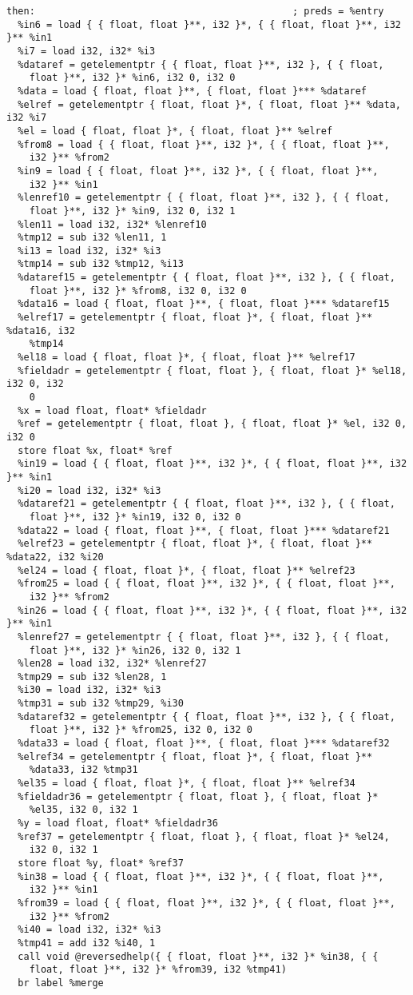 \documentclass[main.tex]{subfiles}
\begin{document}
{\begin{lstlisting}
then:                                             ; preds = %entry
  %in6 = load { { float, float }**, i32 }*, { { float, float }**, i32 }** %in1
  %i7 = load i32, i32* %i3
  %dataref = getelementptr { { float, float }**, i32 }, { { float,
    float }**, i32 }* %in6, i32 0, i32 0
  %data = load { float, float }**, { float, float }*** %dataref
  %elref = getelementptr { float, float }*, { float, float }** %data, i32 %i7
  %el = load { float, float }*, { float, float }** %elref
  %from8 = load { { float, float }**, i32 }*, { { float, float }**,
    i32 }** %from2
  %in9 = load { { float, float }**, i32 }*, { { float, float }**,
    i32 }** %in1
  %lenref10 = getelementptr { { float, float }**, i32 }, { { float, 
    float }**, i32 }* %in9, i32 0, i32 1
  %len11 = load i32, i32* %lenref10
  %tmp12 = sub i32 %len11, 1
  %i13 = load i32, i32* %i3
  %tmp14 = sub i32 %tmp12, %i13
  %dataref15 = getelementptr { { float, float }**, i32 }, { { float,
    float }**, i32 }* %from8, i32 0, i32 0
  %data16 = load { float, float }**, { float, float }*** %dataref15
  %elref17 = getelementptr { float, float }*, { float, float }** %data16, i32
    %tmp14
  %el18 = load { float, float }*, { float, float }** %elref17
  %fieldadr = getelementptr { float, float }, { float, float }* %el18, i32 0, i32
    0
  %x = load float, float* %fieldadr
  %ref = getelementptr { float, float }, { float, float }* %el, i32 0, i32 0
  store float %x, float* %ref
  %in19 = load { { float, float }**, i32 }*, { { float, float }**, i32 }** %in1
  %i20 = load i32, i32* %i3
  %dataref21 = getelementptr { { float, float }**, i32 }, { { float,
    float }**, i32 }* %in19, i32 0, i32 0
  %data22 = load { float, float }**, { float, float }*** %dataref21
  %elref23 = getelementptr { float, float }*, { float, float }** %data22, i32 %i20
  %el24 = load { float, float }*, { float, float }** %elref23
  %from25 = load { { float, float }**, i32 }*, { { float, float }**,
    i32 }** %from2
  %in26 = load { { float, float }**, i32 }*, { { float, float }**, i32 }** %in1
  %lenref27 = getelementptr { { float, float }**, i32 }, { { float,
    float }**, i32 }* %in26, i32 0, i32 1
  %len28 = load i32, i32* %lenref27
  %tmp29 = sub i32 %len28, 1
  %i30 = load i32, i32* %i3
  %tmp31 = sub i32 %tmp29, %i30
  %dataref32 = getelementptr { { float, float }**, i32 }, { { float,
    float }**, i32 }* %from25, i32 0, i32 0
  %data33 = load { float, float }**, { float, float }*** %dataref32
  %elref34 = getelementptr { float, float }*, { float, float }** 
    %data33, i32 %tmp31
  %el35 = load { float, float }*, { float, float }** %elref34
  %fieldadr36 = getelementptr { float, float }, { float, float }* 
    %el35, i32 0, i32 1
  %y = load float, float* %fieldadr36
  %ref37 = getelementptr { float, float }, { float, float }* %el24, 
    i32 0, i32 1
  store float %y, float* %ref37
  %in38 = load { { float, float }**, i32 }*, { { float, float }**, 
    i32 }** %in1
  %from39 = load { { float, float }**, i32 }*, { { float, float }**,
    i32 }** %from2
  %i40 = load i32, i32* %i3
  %tmp41 = add i32 %i40, 1
  call void @reversedhelp({ { float, float }**, i32 }* %in38, { { 
    float, float }**, i32 }* %from39, i32 %tmp41)
  br label %merge


\end{lstlisting}}
\end{document}
